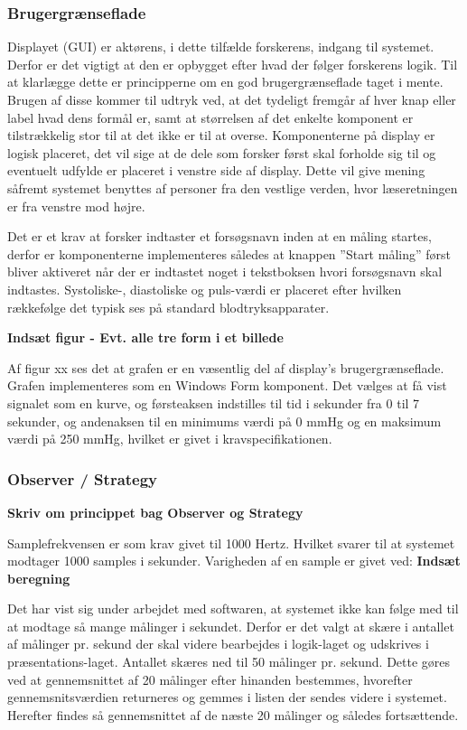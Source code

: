 \subsubsection{Brugergrænseflade}
Displayet (GUI) er aktørens, i dette tilfælde forskerens, indgang til systemet. Derfor er det vigtigt at den er opbygget efter hvad der følger forskerens logik. Til at klarlægge dette er principperne om en god brugergrænseflade taget i mente. Brugen af disse kommer til udtryk ved, at det tydeligt fremgår af hver knap eller label hvad dens formål er, samt at størrelsen af det enkelte komponent er tilstrækkelig stor til at det ikke er til at overse. Komponenterne på display er logisk placeret, det vil sige at de dele som forsker først skal forholde sig til og eventuelt udfylde er placeret i venstre side af display. Dette vil give mening såfremt systemet benyttes af personer fra den vestlige verden, hvor læseretningen er fra venstre mod højre. 

Det er et krav at forsker indtaster et forsøgsnavn inden at en måling startes, derfor er komponenterne implementeres således at knappen ”Start måling” først bliver aktiveret når der er indtastet noget i tekstboksen hvori forsøgsnavn skal indtastes. Systoliske-, diastoliske og puls-værdi er placeret efter hvilken rækkefølge det typisk ses på standard blodtryksapparater. 

\textbf{Indsæt figur - Evt. alle tre form i et billede}

Af figur xx ses det at grafen er en væsentlig del af display’s brugergrænseflade. Grafen implementeres som en Windows Form komponent. Det vælges at få vist signalet som en kurve, og førsteaksen indstilles til tid i sekunder fra 0 til 7 sekunder, og andenaksen til en minimums værdi på 0 mmHg og en maksimum værdi på 250 mmHg, hvilket er givet i kravspecifikationen. 

\subsubsection{Observer / Strategy}
\textbf{Skriv om princippet bag Observer og Strategy}

Samplefrekvensen er som krav givet til 1000 Hertz. Hvilket svarer til at systemet modtager 1000 samples i sekunder. Varigheden af en sample er givet ved: \textbf{Indsæt beregning}

Det har vist sig under arbejdet med softwaren, at systemet ikke kan følge med til at modtage så mange målinger i sekundet. Derfor er det valgt at skære i antallet af målinger pr. sekund der skal videre bearbejdes i logik-laget og udskrives i præsentations-laget. Antallet skæres ned til 50 målinger pr. sekund. Dette gøres ved at gennemsnittet af 20 målinger efter hinanden bestemmes, hvorefter gennemsnitsværdien returneres og gemmes i listen der sendes videre i systemet. Herefter findes så gennemsnittet af de næste 20 målinger og således fortsættende.   

